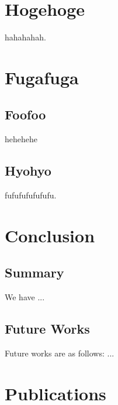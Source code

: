\documentclass[12pt,epsf,dvipdfmx]{report}
\begin{document}
\chapter{Hogehoge}

hahahahah.

\chapter{Fugafuga}
\section{Foofoo}
hehehehe

\section{Hyohyo}

fufufufufufufu.

\chapter{Conclusion}
\section{Summary}

We have ...

\section{Future Works}

Future works are as follows: ...

\newpage

\chapter*{Publications}
\end{document}
